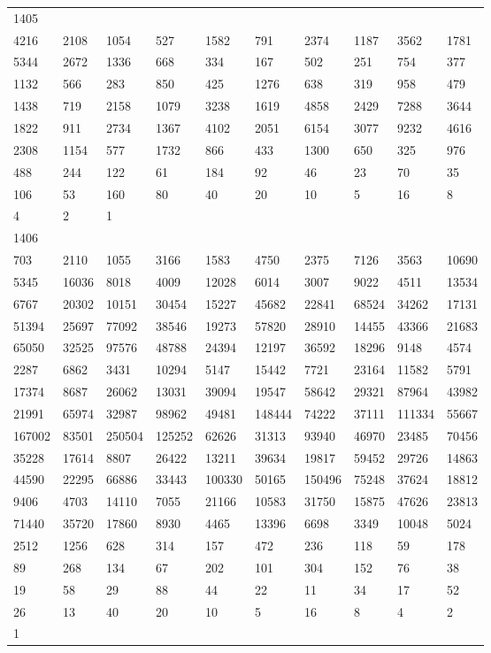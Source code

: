 \begin{longtable}{*{10}{l}}
1405&&&&&&&&&\\
4216& 2108& 1054& 527& 1582& 791& 2374& 1187& 3562& 1781\\
5344& 2672& 1336& 668& 334& 167& 502& 251& 754& 377\\
1132& 566& 283& 850& 425& 1276& 638& 319& 958& 479\\
1438& 719& 2158& 1079& 3238& 1619& 4858& 2429& 7288& 3644\\
1822& 911& 2734& 1367& 4102& 2051& 6154& 3077& 9232& 4616\\
2308& 1154& 577& 1732& 866& 433& 1300& 650& 325& 976\\
488& 244& 122& 61& 184& 92& 46& 23& 70& 35\\
106& 53& 160& 80& 40& 20& 10& 5& 16& 8\\
4& 2& 1& \\

1406&&&&&&&&&\\
703& 2110& 1055& 3166& 1583& 4750& 2375& 7126& 3563& 10690\\
5345& 16036& 8018& 4009& 12028& 6014& 3007& 9022& 4511& 13534\\
6767& 20302& 10151& 30454& 15227& 45682& 22841& 68524& 34262& 17131\\
51394& 25697& 77092& 38546& 19273& 57820& 28910& 14455& 43366& 21683\\
65050& 32525& 97576& 48788& 24394& 12197& 36592& 18296& 9148& 4574\\
2287& 6862& 3431& 10294& 5147& 15442& 7721& 23164& 11582& 5791\\
17374& 8687& 26062& 13031& 39094& 19547& 58642& 29321& 87964& 43982\\
21991& 65974& 32987& 98962& 49481& 148444& 74222& 37111& 111334& 55667\\
167002& 83501& 250504& 125252& 62626& 31313& 93940& 46970& 23485& 70456\\
35228& 17614& 8807& 26422& 13211& 39634& 19817& 59452& 29726& 14863\\
44590& 22295& 66886& 33443& 100330& 50165& 150496& 75248& 37624& 18812\\
9406& 4703& 14110& 7055& 21166& 10583& 31750& 15875& 47626& 23813\\
71440& 35720& 17860& 8930& 4465& 13396& 6698& 3349& 10048& 5024\\
2512& 1256& 628& 314& 157& 472& 236& 118& 59& 178\\
89& 268& 134& 67& 202& 101& 304& 152& 76& 38\\
19& 58& 29& 88& 44& 22& 11& 34& 17& 52\\
26& 13& 40& 20& 10& 5& 16& 8& 4& 2\\
1& \\


\end{longtable}
